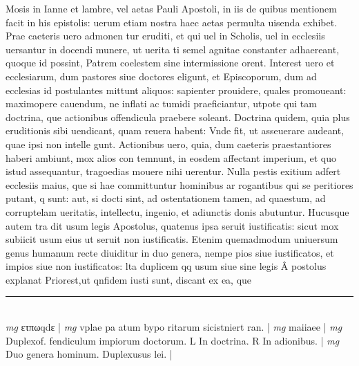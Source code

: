 \documentclass{article}
\begin{document}
\begin{pages}
Mosis in Ianne et lambre, vel aetas Pauli Apostoli, in iis de quibus mentionem facit in his epistolis: uerum etiam nostra haec aetas permulta uisenda exhibet. Prae caeteris uero admonen tur eruditi, et qui uel in Scholis, uel in ecclesiis uersantur in docendi munere, ut uerita ti semel agnitae constanter adhaereant, quoque  id possint, Patrem coelestem sine intermissione orent. Interest uero et ecclesiarum, dum pastores siue doctores eligunt, et Episcoporum, dum ad ecclesias id postulantes mittunt aliquos: sapienter prouidere, quales promoueant: maximopere cauendum, ne inflati ac tumidi praeficiantur, utpote qui tam doctrina, que  actionibus offendicula praebere soleant. Doctrina quidem, quia plus eruditionis sibi uendicant, quam reuera habent: Vnde fit, ut asseuerare audeant, quae ipsi non intelle gunt. Actionibus uero, quia, dum caeteris praestantiores haberi ambiunt, mox alios con temnunt, in eosdem affectant imperium, et quo istud assequantur, tragoedias mouere nihi uerentur. Nulla pestis exitium adfert ecclesiis maius, que  si hae committuntur hominibus ar rogantibus  qui se peritiores putant, q sunt: aut, si docti sint, ad ostentationem tamen, ad quaestum, ad corruptelam ueritatis, intellectu, ingenio, et adiunctis donis abutuntur. Hucusque  autem tra dit usum legis Apostolus, quatenus ipsa seruit iustificatis: sicut mox subiicit usum eius ut seruit non iustificatis. Etenim quemadmodum uniuersum genus humanum recte diuiditur in duo genera, nempe pios siue iustificatos, et impios siue non iustificatos: lta duplicem qq usum siue sine legis Â postolus explanat Priorest,ut qnfidem iusti sunt, discant ex ea, que  \pend
\vspace{0.5cm}\noindent
\vspace{0.2cm}\rule{1cm}{0.2pt}\\ 
\hspace{0.2cm}\textit{mg}
\footnotesize ετπωqdε 
\normalsize| 
\hspace{0.2cm}\textit{mg}
\footnotesize vplae pa atum bypo ritarum sicistniert ran. 
\normalsize| 
\hspace{0.2cm}\textit{mg}
\footnotesize maiiaee 
\normalsize| 
\hspace{0.2cm}\textit{mg}
\footnotesize Duplexof. fendiculum impiorum doctorum. L In doctrina. R In adionibus. 
\normalsize| 
\hspace{0.2cm}\textit{mg}
\footnotesize Duo genera hominum. Duplexusus lei. 
\normalsize| 

\end{pages}
\end{document}

